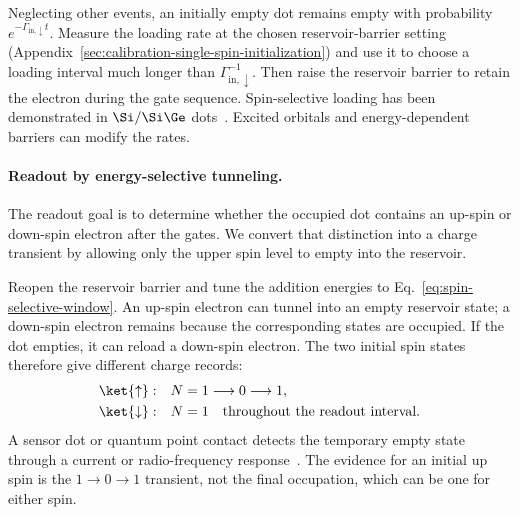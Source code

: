 Neglecting other events, an initially empty dot remains empty with
probability $e^{-\Gamma_{\mathrm{in},\downarrow}t}$.
Measure the loading rate at the chosen reservoir-barrier setting
(Appendix~\ref{sec:calibration-single-spin-initialization}) and use
it to choose a loading interval much longer than
$\Gamma_{\mathrm{in},\downarrow}^{-1}$. Then raise the reservoir
barrier to retain the electron during the gate sequence.
Spin-selective loading has been demonstrated in
$\Si/\Si\Ge$ dots~\cite{Simmons2011}.
Excited orbitals and energy-dependent barriers can modify the rates.

\paragraph{Readout by energy-selective tunneling.}
\label{sec:energy-selective-readout}

The readout goal is to determine whether the occupied dot contains
an up-spin or down-spin electron after the gates.
We convert that distinction into a charge transient by allowing
only the upper spin level to empty into the reservoir.

Reopen the reservoir barrier and tune the addition energies to
Eq.~\eqref{eq:spin-selective-window}.
An up-spin electron can tunnel into an empty reservoir state;
a down-spin electron remains because the corresponding states
are occupied. If the dot empties, it can reload a down-spin electron.
The two initial spin states therefore give different charge records:
\begin{equation}
  \begin{aligned}
    \ket{\uparrow}:&\quad N=1\longrightarrow0\longrightarrow1,\\
    \ket{\downarrow}:&\quad N=1\quad\text{throughout the readout interval}.
  \end{aligned}
  \label{eq:energy-readout-records}
\end{equation}
A sensor dot or quantum point contact detects the temporary empty
state through a current or radio-frequency response~\cite{Elzerman2004}.
The evidence for an initial up spin is the $1\to0\to1$ transient,
not the final occupation, which can be one for either spin.

